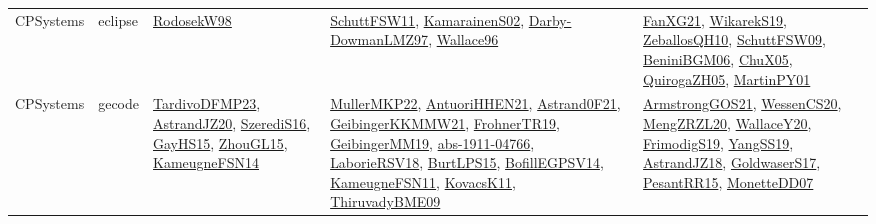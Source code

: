 {\begin{longtable}{lp{3cm}>{\raggedright}p{6cm}>{\raggedright}p{6cm}p{8cm}}
CPSystems & eclipse & \href{papers/RodosekW98.pdf}{RodosekW98}\cite{RodosekW98} & \href{articles/SchuttFSW11.pdf}{SchuttFSW11}\cite{SchuttFSW11}, \href{papers/KamarainenS02.pdf}{KamarainenS02}\cite{KamarainenS02}, \href{articles/Darby-DowmanLMZ97.pdf}{Darby-DowmanLMZ97}\cite{Darby-DowmanLMZ97}, \href{articles/Wallace96.pdf}{Wallace96}\cite{Wallace96} & \href{articles/FanXG21.pdf}{FanXG21}\cite{FanXG21}, \href{articles/WikarekS19.pdf}{WikarekS19}\cite{WikarekS19}, \href{articles/ZeballosQH10.pdf}{ZeballosQH10}\cite{ZeballosQH10}, \href{papers/SchuttFSW09.pdf}{SchuttFSW09}\cite{SchuttFSW09}, \href{papers/BeniniBGM06.pdf}{BeniniBGM06}\cite{BeniniBGM06}, \href{papers/ChuX05.pdf}{ChuX05}\cite{ChuX05}, \href{papers/QuirogaZH05.pdf}{QuirogaZH05}\cite{QuirogaZH05}, \href{articles/MartinPY01.pdf}{MartinPY01}\cite{MartinPY01}\\
CPSystems & gecode & \href{papers/TardivoDFMP23.pdf}{TardivoDFMP23}\cite{TardivoDFMP23}, \href{articles/AstrandJZ20.pdf}{AstrandJZ20}\cite{AstrandJZ20}, \href{papers/SzerediS16.pdf}{SzerediS16}\cite{SzerediS16}, \href{papers/GayHS15.pdf}{GayHS15}\cite{GayHS15}, \href{papers/ZhouGL15.pdf}{ZhouGL15}\cite{ZhouGL15}, \href{articles/KameugneFSN14.pdf}{KameugneFSN14}\cite{KameugneFSN14} & \href{articles/MullerMKP22.pdf}{MullerMKP22}\cite{MullerMKP22}, \href{papers/AntuoriHHEN21.pdf}{AntuoriHHEN21}\cite{AntuoriHHEN21}, \href{papers/Astrand0F21.pdf}{Astrand0F21}\cite{Astrand0F21}, \href{papers/GeibingerKKMMW21.pdf}{GeibingerKKMMW21}\cite{GeibingerKKMMW21}, \href{papers/FrohnerTR19.pdf}{FrohnerTR19}\cite{FrohnerTR19}, \href{papers/GeibingerMM19.pdf}{GeibingerMM19}\cite{GeibingerMM19}, \href{articles/abs-1911-04766.pdf}{abs-1911-04766}\cite{abs-1911-04766}, \href{articles/LaborieRSV18.pdf}{LaborieRSV18}\cite{LaborieRSV18}, \href{papers/BurtLPS15.pdf}{BurtLPS15}\cite{BurtLPS15}, \href{papers/BofillEGPSV14.pdf}{BofillEGPSV14}\cite{BofillEGPSV14}, \href{papers/KameugneFSN11.pdf}{KameugneFSN11}\cite{KameugneFSN11}, \href{articles/KovacsK11.pdf}{KovacsK11}\cite{KovacsK11}, \href{papers/ThiruvadyBME09.pdf}{ThiruvadyBME09}\cite{ThiruvadyBME09} & \href{papers/ArmstrongGOS21.pdf}{ArmstrongGOS21}\cite{ArmstrongGOS21}, \href{papers/WessenCS20.pdf}{WessenCS20}\cite{WessenCS20}, \href{articles/MengZRZL20.pdf}{MengZRZL20}\cite{MengZRZL20}, \href{articles/WallaceY20.pdf}{WallaceY20}\cite{WallaceY20}, \href{papers/FrimodigS19.pdf}{FrimodigS19}\cite{FrimodigS19}, \href{papers/YangSS19.pdf}{YangSS19}\cite{YangSS19}, \href{papers/AstrandJZ18.pdf}{AstrandJZ18}\cite{AstrandJZ18}, \href{papers/GoldwaserS17.pdf}{GoldwaserS17}\cite{GoldwaserS17}, \href{papers/PesantRR15.pdf}{PesantRR15}\cite{PesantRR15}, \href{papers/MonetteDD07.pdf}{MonetteDD07}\cite{MonetteDD07}\\

\end{longtable}}
